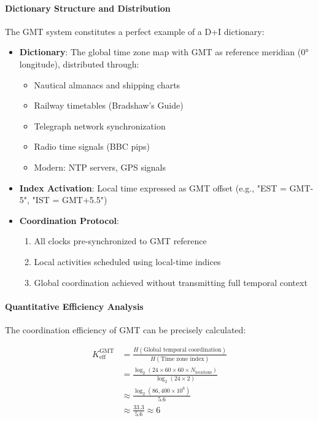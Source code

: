 \documentclass[11pt,a4paper]{article}
\begin{document}
	\paragraph{Dictionary Structure and Distribution}
	The GMT system constitutes a perfect example of a D+I dictionary:
	
	\begin{itemize}
		\item \textbf{Dictionary}: The global time zone map with GMT as reference meridian (0° longitude), distributed through:
		\begin{itemize}
			\item Nautical almanacs and shipping charts
			\item Railway timetables (Bradshaw's Guide)
			\item Telegraph network synchronization
			\item Radio time signals (BBC pips)
			\item Modern: NTP servers, GPS signals
		\end{itemize}
		
		\item \textbf{Index Activation}: Local time expressed as GMT offset (e.g., "EST = GMT-5", "IST = GMT+5.5")
		
		\item \textbf{Coordination Protocol}: 
		\begin{enumerate}
			\item All clocks pre-synchronized to GMT reference
			\item Local activities scheduled using local-time indices
			\item Global coordination achieved without transmitting full temporal context
		\end{enumerate}
	\end{itemize}
	
	\paragraph{Quantitative Efficiency Analysis}
	The coordination efficiency of GMT can be precisely calculated:
	
	\begin{align}
		K_{\mathrm{eff}}^{\mathrm{GMT}} &= \frac{H(\text{Global temporal coordination})}{H(\text{Time zone index})} \\
		&= \frac{\log_2\left(24 \times 60 \times 60 \times N_{\text{locations}}\right)}{\log_2(24 \times 2)} \\
		&\approx \frac{\log_2(86,400 \times 10^6)}{5.6} \\
		&\approx \frac{33.3}{5.6} \approx 6
	\end{align}
	
\end{document}
